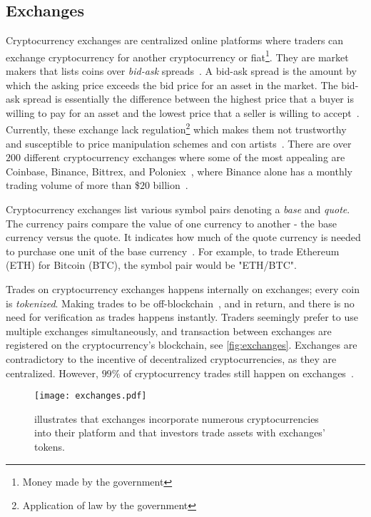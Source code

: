 \subsection{Exchanges}\label{sec:exchanges}
Cryptocurrency exchanges are centralized online platforms where traders can exchange cryptocurrency for another cryptocurrency or fiat\footnote{Money made by the government\cite{fiat}}. They are market makers that lists coins over \emph{bid-ask} spreads~\cite{norton_rose}. A bid-ask spread is the amount by which the asking price exceeds the bid price for an asset in the market. The bid-ask spread is essentially the difference between the highest price that a buyer is willing to pay for an asset and the lowest price that a seller is willing to accept~\cite{bidask}. Currently, these exchange lack regulation\footnote{Application of law by the government} which makes them not trustworthy and susceptible to price manipulation schemes and con artists~\cite{exchange_scammers, exchange_scammers_2}. There are over $200$ different cryptocurrency exchanges where some of the most appealing are Coinbase, Binance, Bittrex, and Poloniex~\cite{exchange_best_1, exchange_best_2}, where Binance alone has a monthly trading volume of more than \$$20$ billion~\cite{coinmarketcap_exchange}.

Cryptocurrency exchanges list various symbol pairs denoting a \emph{base} and \emph{quote}. The currency pairs compare the value of one currency to another - the base currency versus the quote. It indicates how much of the quote currency is needed to purchase one unit of the base currency~\cite{investopedia_cryptocurrency}. For example, to trade Ethereum (ETH) for Bitcoin (BTC), the symbol pair would be "ETH/BTC".

Trades on cryptocurrency exchanges happens internally on exchanges; every coin is \emph{tokenized}. Making trades to be off-blockchain~\cite{exchange_off_chain}, and in return, and there is no need for verification as trades happens instantly. Traders seemingly prefer to use multiple exchanges simultaneously, and transaction between exchanges are registered on the cryptocurrency's blockchain, see \autoref{fig:exchanges}. Exchanges are contradictory to the incentive of decentralized cryptocurrencies, as they are centralized. However, $99\%$ of cryptocurrency trades still happen on exchanges~\cite{coinsutra}.

\begin{figure}[ht]
    \centering
    \texttt{[image: exchanges.pdf]}
    \caption[Ecosystem of cryptocurrencies and exchanges]{illustrates that exchanges incorporate numerous cryptocurrencies into their platform and that investors trade assets with exchanges' tokens.}
\label{fig:exchanges}
\end{figure}

